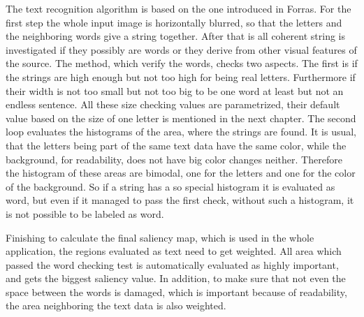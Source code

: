 \documentclass[draft,final]{vutinfth} %
\begin{document}
The text recognition algorithm is based on the one introduced in Forras.
For the first step the whole input image is horizontally blurred, so that the letters and the neighboring words give a string together.
After that is all coherent string is investigated if they possibly are words or they derive from other visual features of the source.
The method, which verify the words, checks two aspects.
The first is if the strings are high enough but not too high for being real letters.
Furthermore if their width is not too small but not too big to be one word at least but not an endless sentence.
All these size checking values are parametrized, their default value based on the size of one letter is mentioned in the next chapter. 
The second loop evaluates the histograms of the area, where the strings are found.
It is usual, that the letters being part of the same text data have the same color, while the background, for readability, does not have big color changes neither.
Therefore the histogram of these areas are bimodal, one for the letters and one for the color of the background.
So if a string has a so special histogram it is evaluated as word, but even if it managed to pass the first check, without such a histogram, it is not possible to be labeled as word. \par 
Finishing to calculate the final saliency map, which is used in the whole application, the regions evaluated as text need to get weighted.
All area which passed the word checking test is automatically evaluated as highly important, and gets the biggest saliency value.
In addition, to make sure that not even the space between the words is damaged, which is important because of readability, the area neighboring the text data is also weighted.
\end{document}
